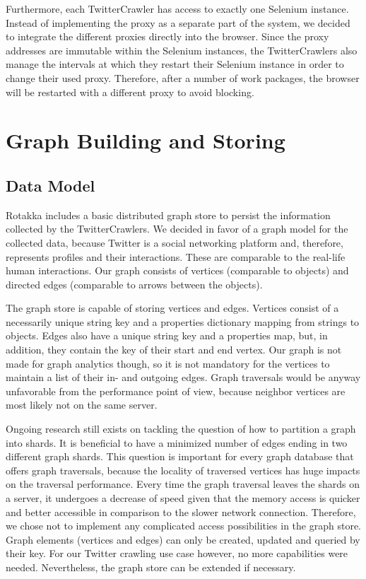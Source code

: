 \documentclass{sigchi}
\begin{document}
Furthermore, each TwitterCrawler has access to exactly one Selenium instance. Instead of implementing the proxy as a separate part of the system, we decided to integrate the different proxies directly into the browser. Since the proxy addresses are immutable within the Selenium instances, the TwitterCrawlers also manage the intervals at which they restart their Selenium instance in order to change their used proxy. Therefore, after a number of work packages, the browser will be restarted with a different proxy to avoid blocking.


\section{Graph Building and Storing}

\subsection{Data Model}

Rotakka includes a basic distributed graph store to persist the information collected by the TwitterCrawlers. We decided in favor of a graph model for the collected data, because Twitter is a social networking platform and, therefore, represents profiles and their interactions. These are comparable to the real-life human interactions. Our graph consists of vertices (comparable to objects) and directed edges (comparable to arrows between the objects).

The graph store is capable of storing vertices and edges. Vertices consist of a necessarily unique string key and a properties dictionary mapping from strings to objects. Edges also have a unique string key and a properties map, but, in addition, they contain the key of their start and end vertex. Our graph is not made for graph analytics though, so it is not mandatory for the vertices to maintain a list of their in- and outgoing edges. Graph traversals would be anyway unfavorable from the performance point of view, because neighbor vertices are most likely not on the same server.

Ongoing research still exists on tackling the question of how to partition a graph into shards. It is beneficial to have a minimized number of edges ending in two different graph shards. This question is important for every graph database that offers graph traversals, because the locality of traversed vertices has huge impacts on the traversal performance. Every time the graph traversal leaves the shards on a server, it undergoes a decrease of speed given that the memory access is quicker and better accessible in comparison to the slower network connection. Therefore, we chose not to implement any complicated access possibilities in the graph store. Graph elements (vertices and edges) can only be created, updated and queried by their key. For our Twitter crawling use case however, no more capabilities were needed. Nevertheless, the graph store can be extended if necessary.
\end{document}
